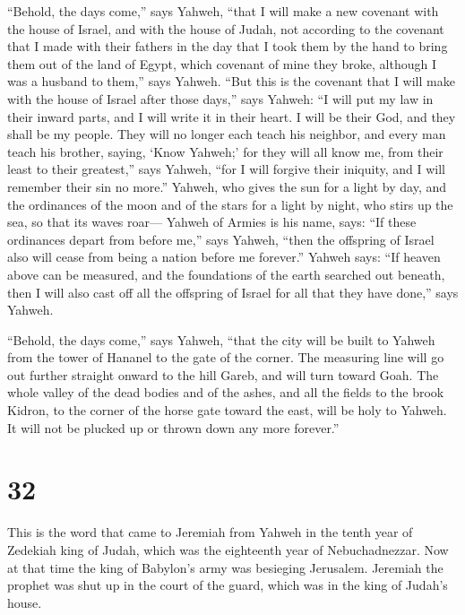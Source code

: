  ``Behold, the days come,'' says Yahweh, ``that I will
make a new covenant with the house of Israel, and with the house of
Judah,  not according to the covenant that I made with
their fathers in the day that I took them by the hand to bring them out
of the land of Egypt, which covenant of mine they broke, although I was
a husband to them,'' says Yahweh.  ``But this is the
covenant that I will make with the house of Israel after those days,''
says Yahweh: ``I will put my law in their inward parts, and I will write
it in their heart. I will be their God, and they shall be my people.
 They will no longer each teach his neighbor, and every
man teach his brother, saying, `Know Yahweh;' for they will all know me,
from their least to their greatest,'' says Yahweh, ``for I will forgive
their iniquity, and I will remember their sin no more.'' 
Yahweh, who gives the sun for a light by day, and the ordinances of the
moon and of the stars for a light by night, who stirs up the sea, so
that its waves roar--- Yahweh of Armies is his name, says:
 ``If these ordinances depart from before me,'' says
Yahweh, ``then the offspring of Israel also will cease from being a
nation before me forever.''  Yahweh says: ``If heaven
above can be measured, and the foundations of the earth searched out
beneath, then I will also cast off all the offspring of Israel for all
that they have done,'' says Yahweh.

 ``Behold, the days come,'' says Yahweh, ``that the city
will be built to Yahweh from the tower of Hananel to the gate of the
corner.  The measuring line will go out further straight
onward to the hill Gareb, and will turn toward Goah.  The
whole valley of the dead bodies and of the ashes, and all the fields to
the brook Kidron, to the corner of the horse gate toward the east, will
be holy to Yahweh. It will not be plucked up or thrown down any more
forever.''

\hypertarget{section-31}{%
\section{32}\label{section-31}}

 This is the word that came to Jeremiah from Yahweh in the
tenth year of Zedekiah king of Judah, which was the eighteenth year of
Nebuchadnezzar.  Now at that time the king of Babylon's
army was besieging Jerusalem. Jeremiah the prophet was shut up in the
court of the guard, which was in the king of Judah's house.

